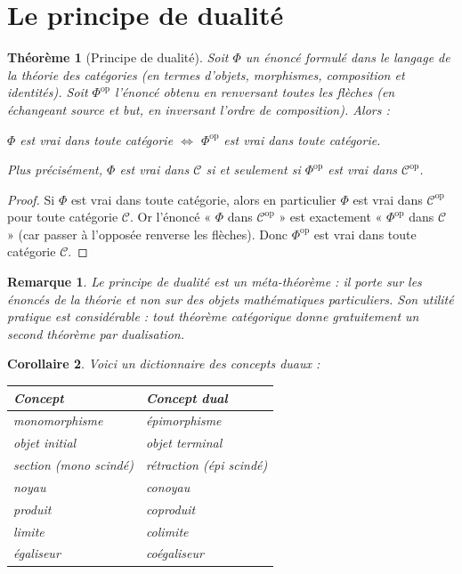 \documentclass[a4paper,12pt]{book}
\newcommand{\op}{\mathrm{op}}
\newtheorem{theoreme}{Théorème}[chapter]
\newtheorem{corollaire}[theoreme]{Corollaire}
\newtheorem*{remarque}{Remarque}
\begin{document}
\section{Le principe de dualité}

\begin{theoreme}[Principe de dualité]\label{thm:dualite}
Soit $\Phi$ un énoncé formulé dans le langage de la théorie des catégories (en termes d'objets, morphismes, composition et identités). Soit $\Phi^{\op}$ l'énoncé obtenu en renversant toutes les flèches (en échangeant source et but, en inversant l'ordre de composition). Alors :
\begin{center}
  $\Phi$ est vrai dans toute catégorie $\iff$ $\Phi^{\op}$ est vrai dans toute catégorie.
\end{center}
Plus précisément, $\Phi$ est vrai dans $\mathcal{C}$ si et seulement si $\Phi^{\op}$ est vrai dans $\mathcal{C}^{\op}$.
\end{theoreme}

\begin{proof}
Si $\Phi$ est vrai dans toute catégorie, alors en particulier $\Phi$ est vrai dans $\mathcal{C}^{\op}$ pour toute catégorie $\mathcal{C}$. Or l'énoncé « $\Phi$ dans $\mathcal{C}^{\op}$ » est exactement « $\Phi^{\op}$ dans $\mathcal{C}$ » (car passer à l'opposée renverse les flèches). Donc $\Phi^{\op}$ est vrai dans toute catégorie $\mathcal{C}$.
\end{proof}

\begin{remarque}
Le principe de dualité est un \emph{méta-théorème} : il porte sur les énoncés de la théorie et non sur des objets mathématiques particuliers. Son utilité pratique est considérable : tout théorème catégorique donne \emph{gratuitement} un second théorème par dualisation.
\end{remarque}

\begin{corollaire}\label{cor:dual-concepts}
Voici un dictionnaire des concepts duaux :
\begin{center}
\begin{tabular}{ll}
\toprule
\textbf{Concept} & \textbf{Concept dual} \\
\midrule
monomorphisme & épimorphisme \\
objet initial & objet terminal \\
section (mono scindé) & rétraction (épi scindé) \\
noyau & conoyau \\
produit & coproduit \\
limite & colimite \\
égaliseur & coégaliseur \\
\bottomrule
\end{tabular}
\end{center}
\end{corollaire}
\end{document}
